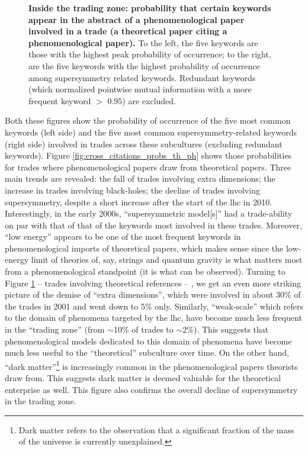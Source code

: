 \documentclass[smallextended]{svjour3}
\begin{document}
\begin{figure}
    \centering
    
    \caption{\textbf{Inside the trading zone: probability that certain keywords appear in the abstract of a phenomenological paper involved in a trade (a theoretical paper citing a phenomenological paper).} To the left, the five keywords are those with the highest peak probability of occurrence; to the right, are the five keywords with the highest probability of occurrence among supersymmetry related keywords. Redundant keywords (which normalized pointwise mutual information with a more frequent keyword $>$ 0.95) are excluded.} 
    \label{fig:cross_citations_probs_ph_th}
\end{figure}

Both these figures show the probability of occurrence of the five most common keywords (left side) and the five most common supersymmetry-related keywords (right side) involved in trades across these subcultures (excluding redundant keywords). Figure \ref{fig:cross_citations_probs_th_ph} shows those probabilities for trades where phenomenological papers draw from theoretical papers. Three main trends are revealed: the fall of trades involving extra dimensions; the increase in trades involving black-holes; the decline of trades involving supersymmetry, despite a short increase after the start of the \gls{lhc} in 2010. Interestingly, in the early 2000s, ``supersymmetric model[s]'' had a trade-ability on par with that of that of the keywords most involved in these trades. Moreover, ``low energy'' appears to be one of the most frequent keywords in phenomenological imports of theoretical papers, which makes sense since the low-energy limit of theories of, say, strings and quantum gravity is what matters most from a phenomenological standpoint (it is what can be observed). Turning to Figure \ref{fig:cross_citations_probs_ph_th} -- trades involving theoretical references -- , we get an even more striking picture of the demise of ``extra dimensions'', which were involved in about 30\% of the trades in 2001 and went down to 5\% only. Similarly, ``weak-scale''  which refers to the domain of phenomena targeted by the \gls{lhc}, have become much less frequent in the ``trading zone'' (from $\sim$10\% of trades to $\sim$2\%). This suggests that phenomenological models dedicated to this domain of phenomena have become much less useful to the ``theoretical'' subculture over time. On the other hand, ``dark matter''\footnote{Dark matter refers to the observation that a significant fraction of the mass of the universe is currently unexplained.} is increasingly common in the phenomenological papers theorists draw from. This suggests dark matter is deemed valuable for the theoretical enterprise as well. This figure also confirms the overall decline of supersymmetry in the trading zone.
\end{document}
